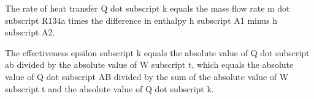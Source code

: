 The rate of heat transfer Q dot subscript k equals the mass flow rate m dot subscript R134a times the difference in enthalpy h subscript A1 minus h subscript A2.

The effectiveness epsilon subscript k equals the absolute value of Q dot subscript ab divided by the absolute value of W subscript t, which equals the absolute value of Q dot subscript AB divided by the sum of the absolute value of W subscript t and the absolute value of Q dot subscript k.